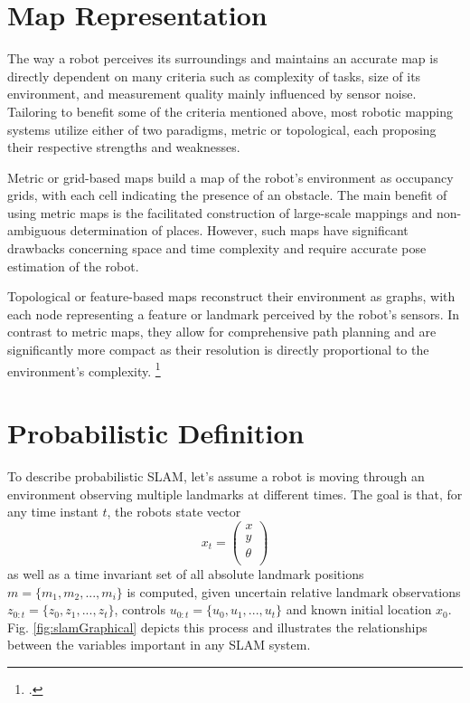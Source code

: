 \section{Map Representation}
The way a robot perceives its surroundings and maintains an accurate map is directly dependent on many criteria such as complexity of tasks, size of its environment, and measurement quality mainly influenced by sensor noise. 
Tailoring to benefit some of the criteria mentioned above, most robotic mapping systems utilize either of two paradigms, metric or topological, each proposing their respective strengths and weaknesses.

Metric or grid-based maps build a map of the robot's environment as occupancy grids, with each cell indicating the presence of an obstacle. The main benefit of using metric maps is the facilitated construction of large-scale mappings and non-ambiguous determination of places. However, such maps have significant drawbacks concerning space and time complexity and require accurate pose estimation of the robot.

Topological or feature-based maps reconstruct their environment as graphs, with each node representing a feature or landmark perceived by the robot's sensors. In contrast to metric maps, they allow for comprehensive path planning and are significantly more compact as their resolution is directly proportional to the environment's complexity. \footcite{thrunMaps1998}


\section{Probabilistic Definition}
To describe probabilistic SLAM, let's assume a robot is moving through an environment observing multiple landmarks at different times. 
The goal is that, for any time instant $ t $, the robots state vector 
\[ x_{t} = 
\begin{pmatrix}
	x \\
	y \\
	\theta \\
\end{pmatrix}
\] as well as a time invariant set of all absolute landmark positions 
$ m = \{ m_{1}, m_{2}, ..., m_{i} \}$ 
is computed, given uncertain relative landmark observations $ z_{0:t} = \{z_{0}, z_{1}, ..., z_{t}\}$, controls $ u_{0:t} = \{u_{0}, u_{1}, ..., u_{t}\}$ and known initial location $ x_{0} $. Fig. \ref{fig:slamGraphical} depicts this process and illustrates the relationships between the variables important in any SLAM system. 

